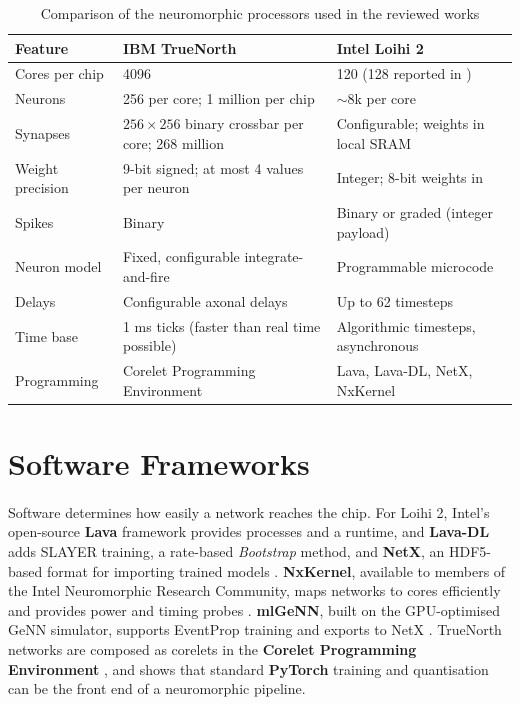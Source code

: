 \documentclass[12pt,a4paper,final]{extreport}
\begin{document}
{\renewcommand{\arraystretch}{1.12}
\begin{table}[htbp]
\centering
\caption{Comparison of the neuromorphic processors used in the reviewed works}\label{tab:hw}
\small
\begin{tabularx}{\textwidth}{|p{3.0cm}|X|X|}
\hline
\textbf{Feature} & \textbf{IBM TrueNorth \cite{p3,merolla2014}} & \textbf{Intel Loihi 2 \cite{p1,p2,p4}} \\ \hline
Cores per chip & 4096 & 120 (128 reported in \cite{p2}) \\ \hline
Neurons & 256 per core; 1 million per chip & $\sim$8k per core \\ \hline
Synapses & $256\times256$ binary crossbar per core; 268 million & Configurable; weights in local SRAM \\ \hline
Weight precision & 9-bit signed; at most 4 values per neuron & Integer; 8-bit weights in \cite{p1,p4} \\ \hline
Spikes & Binary & Binary or graded (integer payload) \\ \hline
Neuron model & Fixed, configurable integrate-and-fire & Programmable microcode \\ \hline
Delays & Configurable axonal delays & Up to 62 timesteps \\ \hline
Time base & 1 ms ticks (faster than real time possible) & Algorithmic timesteps, asynchronous \\ \hline
Programming & Corelet Programming Environment & Lava, Lava-DL, NetX, NxKernel \\ \hline
\end{tabularx}
\end{table}}

\section{Software Frameworks}

\paragraph{} Software determines how easily a network reaches the chip. For Loihi 2, Intel's open-source \textbf{Lava} framework provides processes and a runtime, and \textbf{Lava-DL} adds SLAYER training, a rate-based \emph{Bootstrap} method, and \textbf{NetX}, an HDF5-based format for importing trained models \cite{p2}. \textbf{NxKernel}, available to members of the Intel Neuromorphic Research Community, maps networks to cores efficiently and provides power and timing probes \cite{p1,p4}. \textbf{mlGeNN}, built on the GPU-optimised GeNN simulator, supports EventProp training and exports to NetX \cite{p1}. TrueNorth networks are composed as corelets in the \textbf{Corelet Programming Environment} \cite{p3}, and \cite{p4} shows that standard \textbf{PyTorch} training and quantisation can be the front end of a neuromorphic pipeline.
\end{document}
